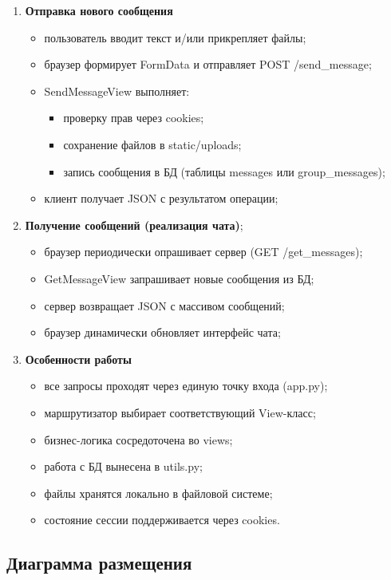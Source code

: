 \begin{enumerate}[leftmargin=*,label=\textbf{\arabic*.}]
	\item \textbf{Отправка нового сообщения}
	\begin{itemize}
		\item пользователь вводит текст и/или прикрепляет файлы;
		\item браузер формирует FormData и отправляет POST /send\_message;
		\item SendMessageView выполняет:
		\begin{itemize}
			\item проверку прав через cookies;
			\item сохранение файлов в static/uploads;
			\item запись сообщения в БД (таблицы messages или group\_messages);
		\end{itemize}
		\item клиент получает JSON с результатом операции;
	\end{itemize}
	
	\item \textbf{Получение сообщений (реализация чата)};
	\begin{itemize}
		\item браузер периодически опрашивает сервер (GET /get\_messages);
		\item GetMessageView запрашивает новые сообщения из БД;
		\item сервер возвращает JSON с массивом сообщений;
		\item браузер динамически обновляет интерфейс чата;
	\end{itemize}
	
	\item \textbf{Особенности работы}
	\begin{itemize}
		\item все запросы проходят через единую точку входа (app.py);
		\item маршрутизатор выбирает соответствующий View-класс;
		\item бизнес-логика сосредоточена во views;
		\item работа с БД вынесена в utils.py;
		\item файлы хранятся локально в файловой системе;
		\item состояние сессии поддерживается через cookies.
	\end{itemize}
\end{enumerate}

\subsection{Диаграмма размещения}

